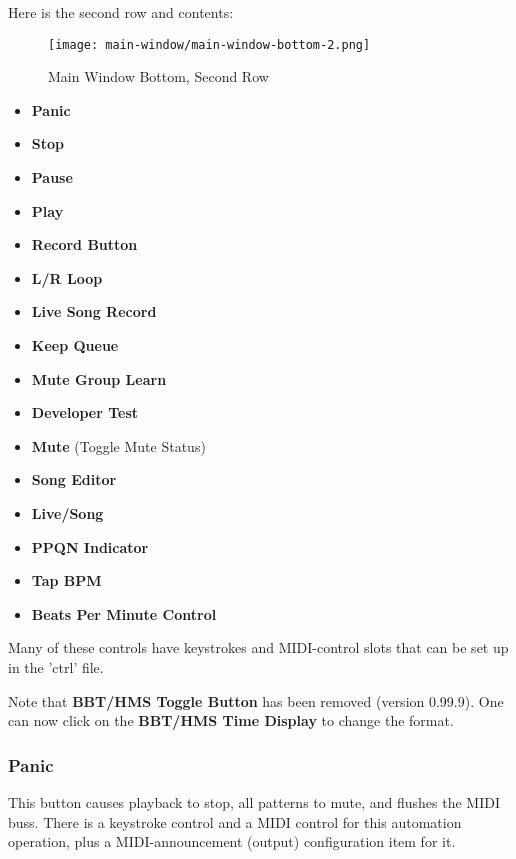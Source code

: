    Here is the second row and contents:

\begin{figure}[H]
   \centering 
   \texttt{[image: main-window/main-window-bottom-2.png]}
   \caption{Main Window Bottom, Second Row}
   \label{fig:main_window_bottom_2}
\end{figure}

   \begin{itemize}
      \item \textbf{Panic}
      \item \textbf{Stop}
      \item \textbf{Pause}
      \item \textbf{Play}
      \item \textbf{Record Button}
      \item \textbf{L/R Loop}
      \item \textbf{Live Song Record}
      \item \textbf{Keep Queue}
      \item \textbf{Mute Group Learn}
      \item \textbf{Developer Test}
      \item \textbf{Mute} (Toggle Mute Status)
      \item \textbf{Song Editor}
      \item \textbf{Live/Song}
      \item \textbf{PPQN Indicator}
      \item \textbf{Tap BPM}
      \item \textbf{Beats Per Minute Control}
   \end{itemize}

   Many of these controls have keystrokes and MIDI-control slots that can be
   set up in the 'ctrl' file.

   Note that \textbf{BBT/HMS Toggle Button} has been removed
   (version 0.99.9).
   One can now click on the \textbf{BBT/HMS Time Display} to
   change the format.

\subsubsection{Panic}
\label{subsubsec:introduction_panic_button}

   This button causes playback to stop, all patterns to mute, and flushes the
   MIDI buss.
   There is a keystroke control and a MIDI control
   for this automation operation, plus
   a MIDI-announcement (output) configuration item for it.

